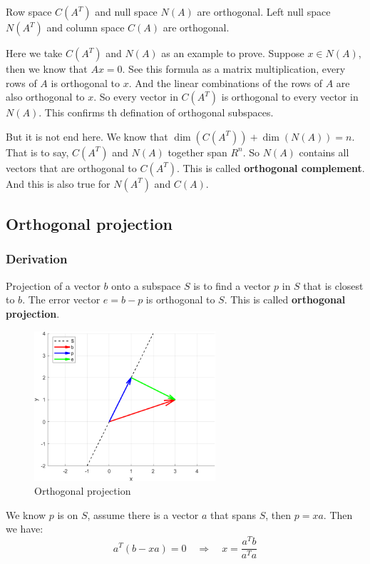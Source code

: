 \documentclass[12pt]{ctexart}
\begin{document}
Row space $C(A^{T})$ and null space $N(A)$ are orthogonal. Left null space $N(A^{T})$
and column space $C(A)$ are orthogonal.

Here we take $C(A^{T})$ and $N(A)$ as an example to prove. Suppose $x \in N(A)$, then
we know that $Ax = 0$. See this formula as a matrix multiplication, every rows of $A$
is orthogonal to $x$. And the linear combinations of the rows of $A$ are also orthogonal to
$x$. So every vector in $C(A^{T})$ is orthogonal to every vector in $N(A)$. This confirms
th defination of orthogonal subspaces.

But it is not end here. We know that $\dim(C(A^{T})) + \dim(N(A)) = n$. That is to say,
$C(A^{T})$ and $N(A)$ together span $R^{n}$. So $N(A)$ contains all vectors that are
orthogonal to $C(A^{T})$. This is called \textbf{orthogonal complement}. And this is also
true for $N(A^{T})$ and $C(A)$.

\subsection{\textbf{Orthogonal projection}}
\subsubsection{\textbf{Derivation}}

Projection of a vector $b$ onto a subspace $S$ is to find a vector $p$ in $S$ that is
closest to $b$. The error vector $e = b - p$ is orthogonal to $S$. This is called
\textbf{orthogonal projection}.
\begin{figure}[H]
  \centering
  \includegraphics[width=0.6\textwidth]{assets/3.2 Orthogonal projection/Orthogonal projection.png}
  \caption{Orthogonal projection}
\end{figure}

We know $p$ is on $S$, assume there is a vector $a$ that spans $S$, then $p = xa$. Then we
have:
\[
  a^{T}(b - xa) = 0 \quad \Rightarrow \quad x = \frac{a^{T}b}{a^{T}a}
\]
\end{document}
